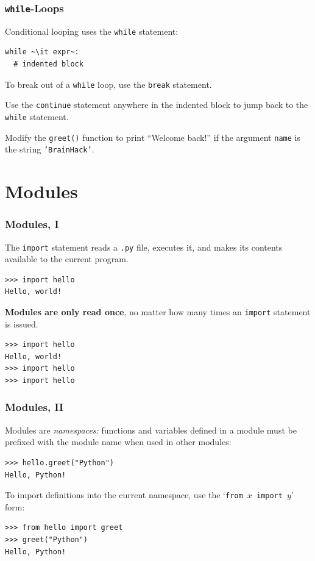 \documentclass[english,serif,mathserif,xcolor=pdftex,dvipsnames,table]{beamer}
\begin{document}
\begin{frame}[fragile]
  \frametitle{\texttt{while}-Loops}
  Conditional looping uses the \texttt{while} statement:
\begin{lstlisting}
while ~\it expr~:
  # indented block
\end{lstlisting}

  \+
  To break out of a \texttt{while} loop, use the \texttt{break}
  statement.

  \+
  Use the \texttt{continue} statement anywhere in the indented
  block to jump back to the \texttt{while} statement.


\end{frame}


\begin{frame}
  \begin{exercise*}[4]
    Modify the \texttt{greet()} function to print ``Welcome back!'' if the
    argument \texttt{name} is the string \texttt{'BrainHack'}.
  \end{exercise*}
\end{frame}


\section{Modules}

\begin{frame}[fragile]
  \frametitle{Modules, I}
  The \texttt{import} statement reads a \texttt{.py} file, executes
  it, and makes its contents available to the current program.
\begin{lstlisting}
>>> import hello
Hello, world!
\end{lstlisting}

  \+
  \textbf{Modules are only read once}, no matter how many times an
  \texttt{import} statement is issued.
\begin{lstlisting}
>>> import hello
Hello, world!
>>> import hello
>>> import hello
\end{lstlisting}

\end{frame}


\begin{frame}[fragile]
  \frametitle{Modules, II}
  Modules are \emph{namespaces:} functions and variables defined in
  a module must be prefixed with the module name when used in other
  modules:
\begin{lstlisting}
>>> hello.greet("Python")
Hello, Python!
\end{lstlisting}

  \+
  To import definitions into the current namespace, use the
  `\texttt{from $x$ import $y$}' form:
\begin{lstlisting}
>>> from hello import greet
>>> greet("Python")
Hello, Python!
\end{lstlisting}
\end{frame}
\end{document}

